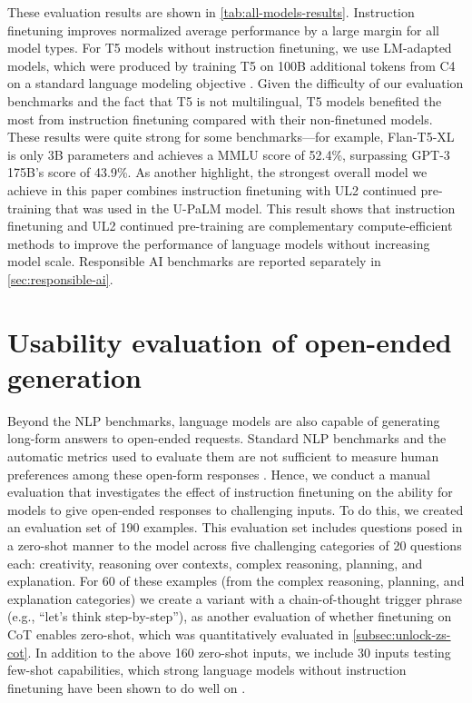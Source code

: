 These evaluation results are shown in \ref{tab:all-models-results}.
Instruction finetuning improves normalized average performance by a large margin for all model types. For T5 models without instruction finetuning, we use LM-adapted models, which were produced by training T5 on 100B additional tokens from C4 on a standard language modeling objective \citep{lester-etal-2021-power}. Given the difficulty of our evaluation benchmarks and the fact that T5 is not multilingual, T5 models benefited the most from instruction finetuning compared with their non-finetuned models. These results were quite strong for some benchmarks---for example, Flan-T5-XL is only 3B parameters and achieves a MMLU score of 52.4\%, surpassing GPT-3 175B's score of 43.9\%.
As another highlight, the strongest overall model we achieve in this paper combines instruction finetuning with UL2 continued pre-training that was used in the U-PaLM model. This result shows that instruction finetuning and UL2 continued pre-training are complementary compute-efficient methods to improve the performance of language models without increasing model scale. Responsible AI benchmarks are reported separately in \ref{sec:responsible-ai}.

\section{Usability evaluation of open-ended generation}\label{sec:human-eval}

Beyond the NLP benchmarks, language models are also capable of generating long-form answers to open-ended requests. Standard NLP benchmarks and the automatic metrics used to evaluate them are not sufficient to measure human preferences among these open-form responses \citep{ouyang2022training}. Hence, we conduct a manual evaluation that investigates the effect of instruction finetuning on the ability for models to give open-ended responses to challenging inputs. To do this, we created an evaluation set of 190 examples. This evaluation set includes questions posed in a zero-shot manner to the model across five challenging categories of 20 questions each: creativity, reasoning over contexts, complex reasoning, planning, and explanation. For 60 of these examples (from the complex reasoning, planning, and explanation categories) we create a variant with a chain-of-thought trigger phrase (e.g., ``let's think step-by-step''), as another evaluation of whether finetuning on CoT enables zero-shot, which was quantitatively evaluated in \ref{subsec:unlock-zs-cot}.
In addition to the above 160 zero-shot inputs, we include 30 inputs testing few-shot capabilities, which strong language models without instruction finetuning have been shown to do well on \citep{chowdhery2022palm}.

